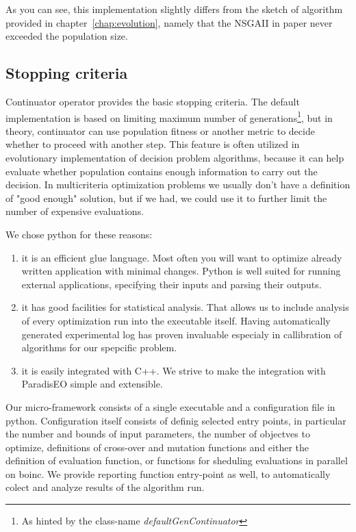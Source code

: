 \documentclass[12pt,oneside]{fithesis2}
\begin{document}
As you can see, this implementation slightly differs from the sketch of algorithm provided in chapter~\ref{chap:evolution}, namely that the NSGAII in paper never exceeded the population size.

\subsection{Stopping criteria}
Continuator operator provides the basic stopping criteria. The default implementation is based on limiting maximum number of generations\footnote{As hinted by the class-name \emph{defaultGenContinuator}}, but in theory, continuator can use population fitness or another metric to decide whether to proceed with another step. This feature is often utilized in evolutionary implementation of decision problem algorithms, because it can help evaluate whether population contains enough information to carry out the decision. In multicriteria optimization problems we usually don't have a definition of "good enough" solution, but if we had, we could use it to further limit the number of expensive evaluations.

We chose python for these reasons:
\begin{enumerate}
\item it is an efficient glue language. 
Most often you will want to optimize already written application with minimal changes. Python is well suited for running external applications, specifying their inputs and parsing their outputs.
 
\item it has good facilities for statistical analysis.
That allows us to include analysis of every optimization run into the executable itself. Having automatically generated experimental log has proven invaluable especialy in callibration of algorithms for our spepcific problem.

\item it is easily integrated with C++.
We strive to make the integration with ParadisEO simple and extensible. 
\end{enumerate}

Our micro-framework consists of a single executable and a configuration file in python. Configuration itself consists of definig selected entry points, in particular the number and bounds of input parameters, the number of objectves to optimize, definitions of cross-over and mutation functions and either the definition of evaluation function, or functions for sheduling evaluations in parallel on boinc. We provide reporting function entry-point as well, to automatically colect and analyze results of the algorithm run.
\end{document}
